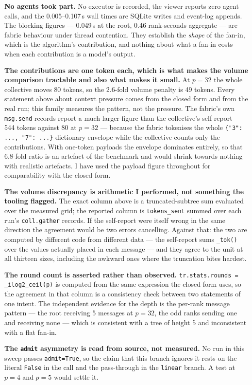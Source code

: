 \documentclass[11pt]{article}
\begin{document}
\textbf{No agents took part.} No executor is recorded, the viewer reports zero agent calls, and
the 0.005--0.107\,s wall times are SQLite writes and event-log appends. The blocking figures ---
0.049\,s at the root, 0.46 rank-seconds aggregate --- are fabric behaviour under thread
contention. They establish the \emph{shape} of the fan-in, which is the algorithm's contribution,
and nothing about what a fan-in costs when each contribution is a model's output.

\textbf{The contributions are one token each, which is what makes the volume comparison
tractable and also what makes it small.} At $p=32$ the whole collective moves 80 tokens, so the
2.6-fold volume penalty is 49 tokens. Every statement above about context pressure comes from the
closed form and from the real run; this family measures the pattern, not the pressure. The
fabric's own \texttt{msg.send} records report a much larger figure than the collective's
self-report --- 544 tokens against 80 at $p=32$ --- because the fabric tokenises the whole
\verb|{"3": ..., "7": ...}| dictionary envelope while the collective counts only the
contributions. With one-token payloads the envelope dominates entirely, so that 6.8-fold ratio is
an artefact of the benchmark and would shrink towards nothing with realistic artefacts. I have
used the payload figure throughout for comparability with the closed form.

\textbf{The volume discrepancy is arithmetic I performed, not something the tooling flagged.} The
exact column above is a truncated-subtree sum evaluated over the measured grid; the reported
column is \texttt{tokens\_sent} summed over each run's \texttt{coll.gather} records. If the
self-report were itself wrong in the same direction the agreement would be two errors cancelling.
Against that: the two are computed by different code from different data --- the self-report sums
\texttt{\_tok()} over the values actually placed in each message --- and they agree to the unit at
all thirteen sizes, including the awkward ones where the truncation bites hardest.

\textbf{The round count is asserted rather than observed.} \texttt{tr.stats.rounds =
\_ilog2\_ceil(p)} is computed from the same expression the closed form uses, so the agreement in
that column is a consistency check between two statements of one intent. The independent evidence
for the depth is the per-rank message pattern --- the root receiving 5 messages at $p=32$, the
odd ranks sending one and receiving none --- which is consistent with a tree of height 5 and
inconsistent with a flat fan-in.

\textbf{The \texttt{admit} asymmetry is read from source, not measured.} No run in this sweep
passes \texttt{admit=True}, so the claim that this branch ignores it rests on the literal
\texttt{False} in the call and the pass-through in the \texttt{linear} branch. A test at $p=4$
and $p=5$ would settle it.
\end{document}
